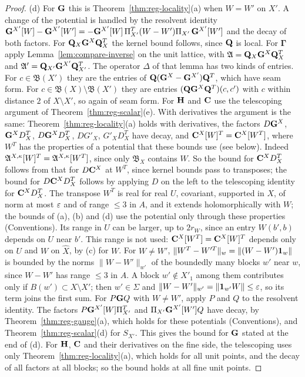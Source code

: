 \begin{proof}
(d) For $\mathbf G$ this is Theorem~\ref{thm:reg-locality}(a) when $W=W'$ on $X'$. A change of the potential is handled by the resolvent identity $\mathbf G^{X'}[W]-\mathbf G^{X'}[W']=-\mathbf G^{X'}[W]\,\Pi_{X'}^T(W-W')\Pi_{X'}\,\mathbf G^{X'}[W']$ and the decay of both factors. For $\mathbf Q_X\mathbf G^X\mathbf Q_X^T$ the kernel bound follows, since $\mathbf Q$ is local. For $\boldsymbol\Gamma$ apply Lemma~\ref{lem:compare-inverse} on the unit lattice, with $\mathfrak A=\mathbf Q_X\mathbf G^X\mathbf Q_X^T$ and $\mathfrak A'=\mathbf Q_{X'}\mathbf G^{X'}\mathbf Q_{X'}^T$. The operator $\Delta$ of that lemma has two kinds of entries. For $c\in\mathfrak B(X')$ they are the entries of $\mathbf Q(\mathbf G^X-\mathbf G^{X'})\mathbf Q^T$, which have seam form. For $c\in\mathfrak B(X)\setminus\mathfrak B(X')$ they are entries $(\mathbf Q\mathbf G^X\mathbf Q^T)(c,c')$ with $c$ within distance $2$ of $X\setminus X'$, so again of seam form. For $\mathbf H$ and $\mathbf C$ use the telescoping argument of Theorem~\ref{thm:reg-scalar}(e). With derivatives the argument is the same: Theorem~\ref{thm:reg-locality}(a) holds with derivatives, the factors $D\mathbf G^X$, $\mathbf G^XD^T_X$, $D\mathbf G^XD^T_X$, $DG'_X$, $G'_XD^T_X$ have decay, and $\mathbf C^X[W]^T=\mathbf C^X[W^T]$, where $W^T$ has the properties of a potential that these bounds use (see below). Indeed $\mathfrak A^{X,\kappa}[W]^T=\mathfrak A^{X,\kappa}[W^T]$, since only $\mathfrak B_X$ contains $W$. So the bound for $\mathbf C^XD^T_X$ follows from that for $D\mathbf C^X$ at $W^T$, since kernel bounds pass to transposes; the bound for $D\mathbf C^XD^T_X$ follows by applying $D$ on the left to the telescoping identity for $\mathbf C^XD^T_X$. The transpose $W^T$ is real for real $U$, covariant, supported in $X$, of norm at most $\varepsilon$ and of range $\le3$ in $A$, and it extends holomorphically with $W$; the bounds of (a), (b) and (d) use the potential only through these properties (Conventions). Its range in $U$ can be larger, up to $2r_W$, since an entry $W(b',b)$ depends on $U$ near $b'$. This range is not used: $\mathbf C^X[W^T]=\mathbf C^X[W]^T$ depends only on $U$ and $W$ on $\hat X$, by (c) for $W$. For $W\ne W'$, $\|W^T-W'^T\|_w=\|(W-W')\mathbf 1_w\|$ is bounded by the norms $\|W-W'\|_{w'}$ of the boundedly many blocks $w'$ near $w$, since $W-W'$ has range $\le3$ in $A$. A block $w'\notin X'_1$ among them contributes only if $B(w')\subset X\setminus X'$; then $w'\in\Sigma$ and $\|W-W'\|_{w'}=\|\mathbf 1_{w'}W\|\le\varepsilon$, so its term joins the first sum. For $P\mathbf G Q$ with $W\ne W'$, apply $P$ and $Q$ to the resolvent identity. The factors $P\mathbf G^{X'}[W]\Pi_{X'}^T$ and $\Pi_{X'}\mathbf G^{X'}[W']Q$ have decay, by Theorem~\ref{thm:reg-gauge}(a), which holds for these potentials (Conventions), and Theorem~\ref{thm:reg-scalar}(d) for $S_{X'}$. This gives the bound for $\mathbf G$ stated at the end of (d). For $\mathbf H$, $\mathbf C$ and their derivatives on the fine side, the telescoping uses only Theorem~\ref{thm:reg-locality}(a), which holds for all unit points, and the decay of all factors at all blocks; so the bound holds at all fine unit points.


\end{proof}
